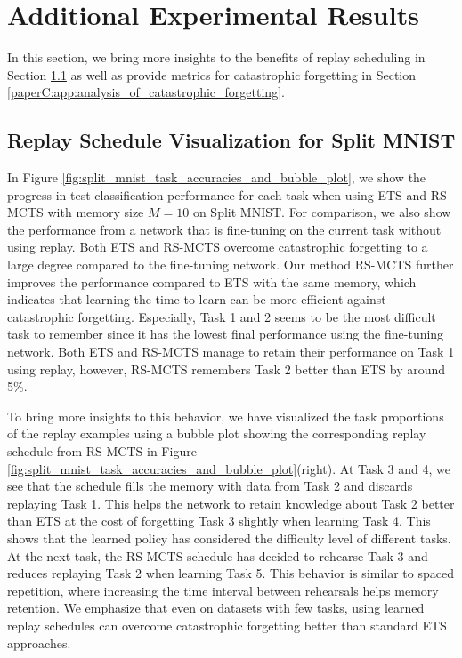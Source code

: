 
\section{Additional Experimental Results}
\label{paperC:app:additional_experimental_results}

In this section, we bring more insights to the benefits of replay scheduling in Section \ref{paperC:app:replay_schedule_visualization_for_split_mnist} as well as provide metrics for catastrophic forgetting in Section \ref{paperC:app:analysis_of_catastrophic_forgetting}.

\subsection{Replay Schedule Visualization for Split MNIST}
\label{paperC:app:replay_schedule_visualization_for_split_mnist}

In Figure \ref{fig:split_mnist_task_accuracies_and_bubble_plot}, we show the progress in test classification performance for each task when using ETS and RS-MCTS with memory size $M=10$ on Split MNIST. For comparison, we also show the performance from a network that is fine-tuning on the current task without using replay. Both ETS and RS-MCTS overcome catastrophic forgetting to a large degree compared to the fine-tuning network. Our method RS-MCTS further improves the performance compared to ETS with the same memory, which indicates that learning the time to learn can be more efficient against catastrophic forgetting. Especially, Task 1 and 2 seems to be the most difficult task to remember since it has the lowest final performance using the fine-tuning network. Both ETS and RS-MCTS manage to retain their performance on Task 1 using replay, however, RS-MCTS remembers Task 2 better than ETS by around 5\%. 

To bring more insights to this behavior, we have visualized the task proportions of the replay examples using a bubble plot showing the corresponding replay schedule from RS-MCTS in Figure \ref{fig:split_mnist_task_accuracies_and_bubble_plot}(right). At Task 3 and 4, we see that the schedule fills the memory with data from Task 2 and discards replaying Task 1. This helps the network to retain knowledge about Task 2 better than ETS at the cost of forgetting Task 3 slightly when learning Task 4. This shows that the learned policy has considered the difficulty level of different tasks. At the next task, the RS-MCTS schedule has decided to rehearse Task 3 and reduces replaying Task 2 when learning Task 5. This behavior is similar to spaced repetition, where increasing the time interval between rehearsals helps memory retention.
We emphasize that even on datasets with few tasks, using learned replay schedules can overcome catastrophic forgetting better than standard ETS approaches.



